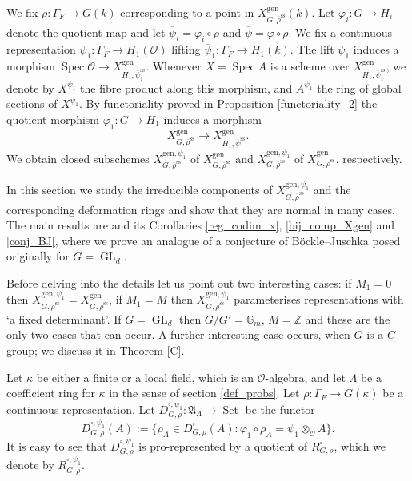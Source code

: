 \documentclass{amsart}
\theoremstyle{definition}
\theoremstyle{remark}
\DeclareMathOperator{\GL}{GL}
\DeclareMathOperator{\Spec}{Spec}
\DeclareMathOperator{\Set}{Set}
\newcommand{\ZZ}{\mathbb Z}
\newcommand{\OO}{\mathcal O}
\newcommand{\rhobar}{\overline{\rho}}
\newcommand{\Gm}{\mathbb G_{m}}
\newcommand{\gen}{\mathrm{gen}}
\newcommand{\Xbar}{\overline{X}}
\newcommand{\rhobarss}{\rhobar^{\mathrm{ss}}}
\newcommand{\psibar}{\overline{\psi}}
\newcommand{\psibarss}{\psibar^{\mathrm {ss}}}
\begin{document}
We fix $\rhobar: \Gamma_F \rightarrow G(k)$ corresponding to a point in $X^{\gen}_{G, \rhobarss}(k)$. 
Let $\varphi_i: G\rightarrow H_i$ denote the quotient map and let $\psibar_i= \varphi_i \circ \rhobar$ and $\psibar= \varphi\circ \rhobar$.
We fix 
a continuous representation $\psi_1: \Gamma_F\rightarrow H_1(\OO)$ lifting $\psibar_1: \Gamma_F\rightarrow H_1(k)$. The lift $\psi_1$ induces a morphism 
$\Spec \OO \rightarrow X^{\gen}_{H_1, \psibarss_1}$.
Whenever $X=\Spec A$ is a scheme over $X^{\gen}_{H_1, \psibarss_1}$, we denote 
by $X^{\psi_1}$ the fibre product along this morphism, and $A^{\psi_1}$ the ring of global sections of
$X^{\psi_1}$. 
By functoriality proved in Proposition \ref{functoriality_2} the quotient morphism $\varphi_1: G\rightarrow H_1$ induces a morphism
\begin{equation}\label{fantastic_man}
X^{\gen}_{G, \rhobarss} \rightarrow X^{\gen}_{H_1, \psibarss_1}.
\end{equation}
We obtain closed subschemes $X^{\gen, \psi_1}_{G, \rhobarss}$ of $X^{\gen}_{G, \rhobarss}$
and $\Xbar^{\gen, \psi_1}_{G, \rhobarss}$ of $\Xbar^{\gen}_{G, \rhobarss}$, respectively. 

In this section we study the irreducible components of
$X^{\gen, \psi_1}_{G, \rhobarss}$ and the corresponding deformation rings and show that they are normal in many cases. 
The main results are  and its Corollaries
\ref{reg_codim_x}, \ref{bij_comp_Xgen} and \ref{conj_BJ}, where we prove an analogue of a conjecture of B\"ockle--Juschka posed originally for $G=\GL_d$.

Before delving  into the details let us point out two interesting cases: if $M_1=0$
then $X^{\gen, \psi_1}_{G, \rhobarss}=X^{\gen}_{G, \rhobarss}$, if $M_1=M$ then $X^{\gen, \psi_1}_{G, \rhobarss}$ parameterises representations with 
`a fixed determinant'. If $G=\GL_d$ then $G/G'=\Gm$, $M=\ZZ$ and these are the only two cases that can occur. A further interesting case occurs, when $G$ is a $C$-group; we discuss it in Theorem 
\ref{C}.

Let $\kappa$ be either a finite or a local field, which is an $\OO$-algebra, and let $\Lambda$ be a coefficient ring for $\kappa$ in the sense of section \ref{def_probs}. Let $\rho: \Gamma_F \rightarrow G(\kappa)$ be a
continuous representation. Let $D^{\square, \psi_1}_{G, \rho}: \mathfrak A_{\Lambda} \rightarrow \Set$ be the functor $$D^{\square, \psi_1}_{G, \rho}(A):= \{\rho_A\in D^{\square}_{G, \rho}(A): \varphi_1\circ \rho_A = \psi_1\otimes_{\OO} A\}.$$ 
It is easy to see that $D^{\square, \psi_1}_{G, \rho}$ is pro-represented by a quotient of $R^{\square}_{G, \rho}$, which we denote by $R^{\square, \psi_1}_{G, \rho}$. 
\end{document}
